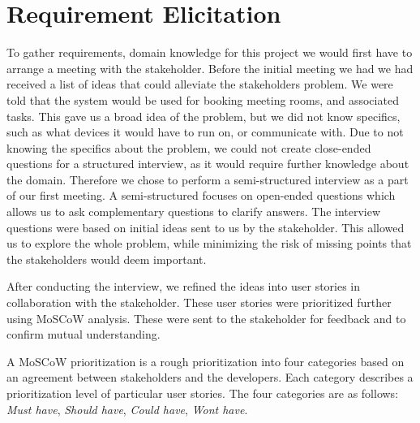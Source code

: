 \section{Requirement Elicitation}\label{sec:requirement_elicitation}

% 




To gather requirements, domain knowledge for this project we would first have to arrange a meeting with the stakeholder. 
Before the initial meeting we had we had received a list of ideas that could alleviate the stakeholders problem.
We were told that the system would be used for booking meeting rooms, and associated tasks. 
This gave us a broad idea of the problem, but we did not know specifics, such as what devices it would have to run on, or communicate with.
Due to not knowing the specifics about the problem, we could not create close-ended questions for a structured interview, as it would require further knowledge about the domain.
Therefore we chose to perform a semi-structured interview as a part of our first meeting.
A semi-structured focuses on open-ended questions which allows us to ask complementary questions to clarify answers. 
The interview questions were based on initial ideas sent to us by the stakeholder. 
This allowed us to explore the whole problem, while minimizing the risk of missing points that the stakeholders would deem important. \cite{InterviewsNHS}



After conducting the interview, we refined the ideas into user stories in collaboration with the stakeholder. These user stories were prioritized further using MoSCoW analysis\cite{DEBbook}.
These were sent to the stakeholder for feedback and to confirm mutual understanding.

A MoSCoW prioritization is a rough prioritization into four categories based on an agreement between stakeholders and the developers.
Each category describes a prioritization level of particular user stories. The four categories are as follows: \textit{Must have}, \textit{Should have}, \textit{Could have}, \textit{Wont have}.

